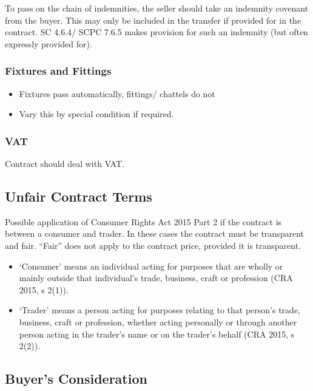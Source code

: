 \documentclass[
]{article}
\providecommand{\tightlist}{%
  \setlength{\itemsep}{0pt}\setlength{\parskip}{0pt}}
\begin{document}
To pass on the chain of indemnities, the seller should take an indemnity
covenant from the buyer. This may only be included in the transfer if
provided for in the contract. SC 4.6.4/ SCPC 7.6.5 makes provision for
such an indemnity (but often expressly provided for).

\hypertarget{fixtures-and-fittings}{%
\subsubsection{Fixtures and Fittings}\label{fixtures-and-fittings}}

\begin{itemize}
\tightlist
\item
  Fixtures pass automatically, fittings/ chattels do not
\item
  Vary this by special condition if required.
\end{itemize}

\hypertarget{vat}{%
\subsubsection{VAT}\label{vat}}

Contract should deal with VAT.

\hypertarget{unfair-contract-terms}{%
\subsection{Unfair Contract Terms}\label{unfair-contract-terms}}

Possible application of Consumer Rights Act 2015 Part 2 if the contract
is between a consumer and trader. In these cases the contract must be
transparent and fair. ``Fair'' does not apply to the contract price,
provided it is transparent.

\begin{itemize}
\tightlist
\item
  `Consumer' means an individual acting for purposes that are wholly or
  mainly outside that individual's trade, business, craft or profession
  (CRA 2015, s 2(1)).
\item
  `Trader' means a person acting for purposes relating to that person's
  trade, business, craft or profession, whether acting personally or
  through another person acting in the trader's name or on the trader's
  behalf (CRA 2015, s 2(2)).
\end{itemize}

\hypertarget{buyers-consideration}{%
\subsection{Buyer's Consideration}\label{buyers-consideration}}
\end{document}
